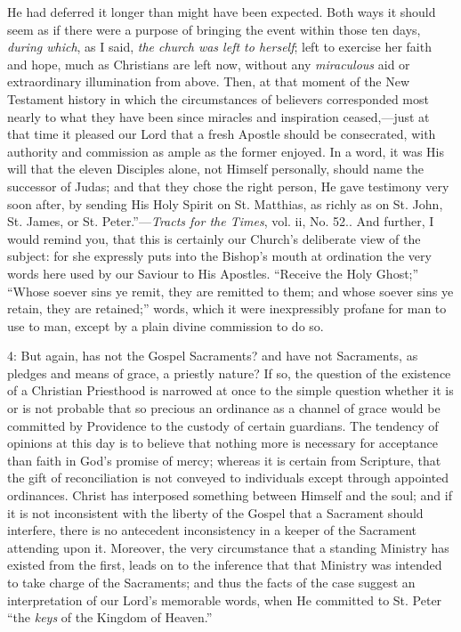 {He had deferred it longer than might have been expected. Both ways it
should seem as if there were a purpose of bringing the event within
those ten days, \emph{during which}, as I said, \emph{the church was left
to herself}; left to exercise her faith and hope, much as Christians
are left now, without any \emph{miraculous} aid or extraordinary
illumination from above. Then, at that moment of the New Testament
history in which the circumstances of believers corresponded most nearly
to what they have been since miracles and inspiration ceased,—just at
that time it pleased our Lord that a fresh Apostle should be
consecrated, with authority and commission as ample as the former
enjoyed. In a word, it was His will that the eleven Disciples alone, not
Himself personally, should name the successor of Judas; and that they
chose the right person, He gave testimony very soon after, by sending
His Holy Spirit on St. Matthias, as richly as on St. John, St. James, or
St. Peter.''—\emph{Tracts for the Times}, vol. ii, No. 52.}. And further, I would
remind you, that this is certainly our Church's deliberate view of the
subject: for she expressly puts into the Bishop's mouth at ordination
the very words here used by our Saviour to His Apostles. ``Receive
the Holy Ghost;'' ``Whose soever sins ye remit, they are
remitted to them; and whose soever sins ye retain, they are
retained;'' words, which it were inexpressibly profane for man to
use to man, except by a plain divine commission to do so.

4: But again, has not the Gospel Sacraments? and have not Sacraments,
as pledges and means of grace, a priestly nature? If so, the question of
the existence of a Christian Priesthood is narrowed at once to the
simple question whether it is or is not probable that so precious an
ordinance as a channel of grace would be committed by Providence to the
custody of certain guardians. The tendency of opinions at this day is to
believe that nothing more is necessary for acceptance than faith in
God's promise of mercy; whereas it is certain from Scripture, that the
gift of reconciliation is not conveyed to individuals except through
appointed ordinances. Christ has interposed something between Himself
and the soul; and if it is not inconsistent with the liberty of the
Gospel that a Sacrament should interfere, there is no antecedent
inconsistency in a keeper of the Sacrament attending upon it. Moreover,
the very circumstance that a standing Ministry has existed from the
first, leads on to the inference that that Ministry was intended to take
charge of the Sacraments; and thus the facts of the case suggest an
interpretation of our Lord's memorable words, when He committed to St.
Peter ``the \emph{keys} of the Kingdom of Heaven.''

